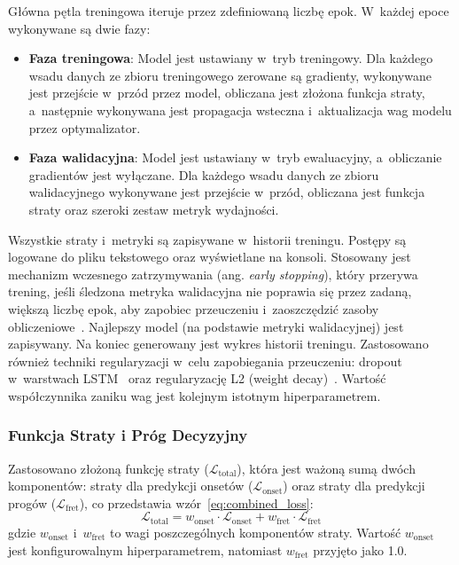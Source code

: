 Główna pętla treningowa iteruje przez zdefiniowaną liczbę epok. W~każdej epoce wykonywane są dwie fazy:
\begin{itemize}
    \item \textbf{Faza treningowa}: Model jest ustawiany w~tryb treningowy. Dla każdego wsadu danych ze zbioru treningowego zerowane są gradienty, wykonywane jest przejście w~przód przez model, obliczana jest złożona funkcja straty, a~następnie wykonywana jest propagacja wsteczna i~aktualizacja wag modelu przez optymalizator.
    \item \textbf{Faza walidacyjna}: Model jest ustawiany w~tryb ewaluacyjny, a~obliczanie gradientów jest wyłączane. Dla każdego wsadu danych ze zbioru walidacyjnego wykonywane jest przejście w~przód, obliczana jest funkcja straty oraz szeroki zestaw metryk wydajności.
\end{itemize}
Wszystkie straty i~metryki są zapisywane w~historii treningu. Postępy są logowane do pliku tekstowego oraz wyświetlane na konsoli. Stosowany jest mechanizm wczesnego zatrzymywania (ang. \textit{early stopping}), który przerywa trening, jeśli śledzona metryka walidacyjna nie poprawia się przez zadaną, większą liczbę epok, aby zapobiec przeuczeniu i~zaoszczędzić zasoby obliczeniowe~\autocite{Benetos2019AutomaticMusicTranscription}. Najlepszy model (na podstawie metryki walidacyjnej) jest zapisywany. Na koniec generowany jest wykres historii treningu. Zastosowano również techniki regularyzacji w~celu zapobiegania przeuczeniu: dropout w~warstwach LSTM~\autocite{Chung2014GRU, KlapuriDavy2006SignalProcessing} oraz regularyzację L2 (weight decay)~\autocite{Loshchilov2019AdamW, KlapuriDavy2006SignalProcessing}. Wartość współczynnika zaniku wag jest kolejnym istotnym hiperparametrem.

\subsubsection{Funkcja Straty i Próg Decyzyjny}
\label{sssec:funkcja_straty_prog}

Zastosowano złożoną funkcję straty ($\mathcal{L}_{\text{total}}$), która jest ważoną sumą dwóch komponentów: straty dla predykcji onsetów ($\mathcal{L}_{\text{onset}}$) oraz straty dla predykcji progów ($\mathcal{L}_{\text{fret}}$), co przedstawia wzór~\ref{eq:combined_loss}:
\begin{equation}
    \mathcal{L}_{\text{total}} = w_{\text{onset}} \cdot \mathcal{L}_{\text{onset}} + w_{\text{fret}} \cdot \mathcal{L}_{\text{fret}}
    \label{eq:combined_loss}
\end{equation}
gdzie $w_{\text{onset}}$ i~$w_{\text{fret}}$ to wagi poszczególnych komponentów straty. Wartość $w_{\text{onset}}$ jest konfigurowalnym hiperparametrem, natomiast $w_{\text{fret}}$ przyjęto jako 1.0.

